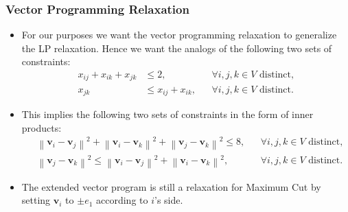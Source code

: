 \documentclass{beamer}
\begin{document}
    \begin{frame}
        \frametitle{Vector Programming Relaxation}
    
        \begin{itemize}
            \item For our purposes we want the vector programming relaxation to generalize the LP relaxation. Hence we want the analogs of the following two sets of constraints:
            \begin{align*}
                x_{ij} + x_{ik} + x_{jk} &\leq 2, && \forall i, j, k \in V \text{ distinct}, \\
                x_{jk} &\leq x_{ij} + x_{ik}, && \forall i, j, k \in V \text{ distinct}.
            \end{align*}
            \pause
            \vspace{-1em}
            \item This implies the following two sets of constraints in the form of inner products:
            {\small
                \begin{align*}
                    &\left\lVert \mathbf v_i - \mathbf v_j \right\rVert^2 + \left\lVert \mathbf v_i - \mathbf v_k \right\rVert^2 + \left\lVert \mathbf v_j - \mathbf v_k \right\rVert^2 \leq 8, && \forall i, j, k \in V \text{ distinct}, \\
                    &\left\lVert \mathbf v_j - \mathbf v_k \right\rVert^2 \leq \left\lVert \mathbf v_i - \mathbf v_j \right\rVert^2 + \left\lVert \mathbf v_i - \mathbf v_k \right\rVert^2, && \forall i, j, k \in V \text{ distinct}.
                \end{align*}
            }
            \pause
            \vspace{-1em}
            \item The extended vector program is still a relaxation for {\sc Maximum Cut} by setting $\mathbf v_i$ to $\pm e_1$ according to $i$'s side.
        \end{itemize}
    \end{frame}
\end{document}
